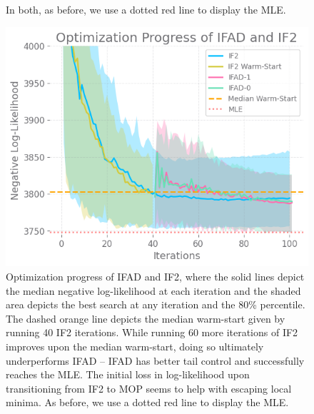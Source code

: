 \documentclass{article}
\begin{document}
\begin{figure}[H]
{    In both, as before, we use a dotted red line to display the MLE. }
    \label{fig:boxplot-search}
\end{figure}

\begin{figure}[htbp!]
    \centering
    \includegraphics[scale=0.7]{imgs/095/optim.png}
    \caption{Optimization progress of IFAD and IF2, where the solid lines depict the median negative log-likelihood at each iteration and the shaded area depicts the best search at any iteration and the 80\% percentile. The dashed orange line depicts the median warm-start given by running 40 IF2 iterations. While running 60 more iterations of IF2 improves upon the median warm-start, doing so ultimately underperforms IFAD -- IFAD has better tail control and successfully reaches the MLE. The initial loss in log-likelihood upon transitioning from IF2 to MOP seems to help with escaping local minima. 
    As before, we use a dotted red line to display the MLE. }
    \label{fig:optim}
\end{figure}
\end{document}
